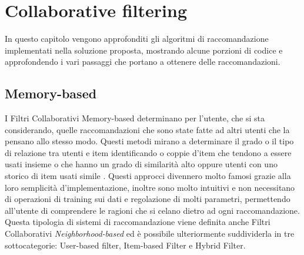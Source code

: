 \chapter{Collaborative filtering}\label{chp:03-recommendationSystems}
In questo capitolo vengono approfonditi gli algoritmi di raccomandazione implementati nella soluzione proposta, mostrando alcune porzioni di 
codice e approfondendo i vari passaggi che portano a ottenere delle raccomandazioni.
%
\section{Memory-based}
I Filtri Collaborativi Memory-based determinano per l'utente, che si sta considerando, quelle raccomandazioni che sono state fatte 
ad altri utenti che la pensano allo stesso modo. Questi metodi mirano a determinare il grado o il tipo di relazione tra utenti e 
item identificando o coppie d'item che tendono a essere usati insieme o che hanno un grado di similarità alto oppure utenti 
con uno storico di item usati simile \cite{taxonomy-of-recommender-agents-on-the-internet}.
Questi approcci divennero molto famosi grazie alla loro semplicità d'implementazione, inoltre sono molto intuitivi e non necessitano di operazioni 
di training sui dati e regolazione di molti parametri, permettendo all'utente di comprendere le ragioni che si celano dietro 
ad ogni raccomandazione.\hfill\break
Questa tipologia di sistemi di raccomandazione viene definita anche Filtri Collaborativi \textit{Neighborhood-based} ed è possibile ulteriormente 
suddividerla in tre sottocategorie: User-based filter, Item-based Filter e Hybrid Filter.
%

